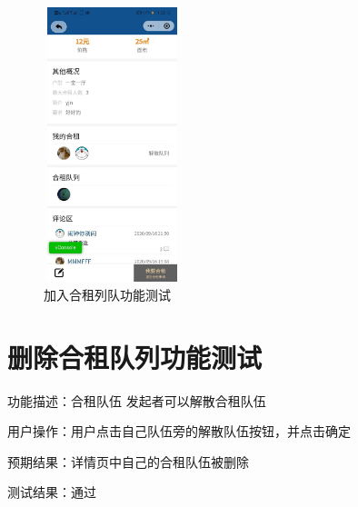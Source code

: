   \begin{figure}[htbp]
       \centering
       \begin{minipage}[t]{0.48\textwidth}
       \centering
       \includegraphics[width=4cm,height=8cm]{test/image/test41.png} 
    
      \caption{加入合租列队功能测试} 
    \end{minipage}
       \end{figure}
      \newpage 

   \section{删除合租队列功能测试}
 
   功能描述：合租队伍 发起者可以解散合租队伍
   
   用户操作：用户点击自己队伍旁的解散队伍按钮，并点击确定
   
   预期结果：详情页中自己的合租队伍被删除   
   
   测试结果：通过
   

